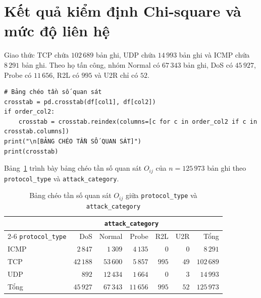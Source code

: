 \section{Kết quả kiểm định Chi-square và mức độ liên hệ}
Giao thức TCP chứa $102\,689$ bản ghi, UDP chứa $14\,993$ bản ghi và ICMP chứa $8\,291$ bản ghi. Theo họ tấn công, nhóm Normal có $67\,343$ bản ghi, DoS có $45\,927$, Probe có $11\,656$, R2L có $995$ và U2R chỉ có $52$.
\begin{lstlisting}[firstnumber=1]
# Bảng chéo tần số quan sát
crosstab = pd.crosstab(df[col1], df[col2])
if order_col2:
    crosstab = crosstab.reindex(columns=[c for c in order_col2 if c in crosstab.columns])
print("\n[BẢNG CHÉO TẦN SỐ QUAN SÁT]")
print(crosstab)
\end{lstlisting}
Bảng~\ref{tab:t34:chi2-observed} trình bày bảng chéo tần số quan sát $O_{ij}$ của $n = 125\,973$ bản ghi theo \texttt{protocol\_type} và \texttt{attack\_category}.

\begin{table}[H]
  \centering
  \caption{Bảng chéo tần số quan sát $O_{ij}$ giữa \texttt{protocol\_type} và \texttt{attack\_category}}
  \label{tab:t34:chi2-observed}
  \begin{tabular}{lrrrrrr}
    \toprule
    & \multicolumn{5}{c}{\texttt{attack\_category}} & \\
    \cmidrule(lr){2-6}
    \texttt{protocol\_type} & DoS & Normal & Probe & R2L & U2R & Tổng \\
    \midrule
    ICMP & $2\,847$  & $1\,309$  & $4\,135$ & $0$   & $0$  & $8\,291$ \\
    TCP  & $42\,188$ & $53\,600$ & $5\,857$ & $995$ & $49$ & $102\,689$ \\
    UDP  & $892$     & $12\,434$ & $1\,664$ & $0$   & $3$  & $14\,993$ \\
    \midrule
    Tổng & $45\,927$ & $67\,343$ & $11\,656$ & $995$ & $52$ & $125\,973$ \\
    \bottomrule
  \end{tabular}
\end{table}

